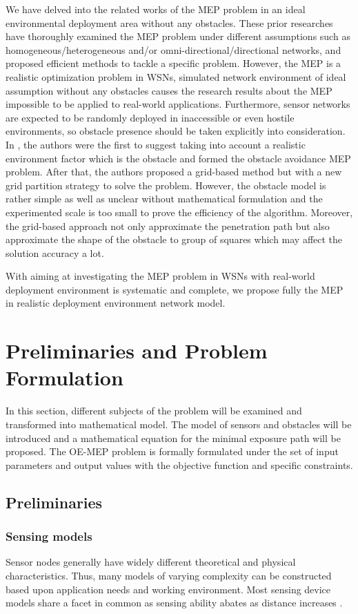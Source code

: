 \documentclass[final]{elsarticle}
\begin{document}
We have delved into the related works of the MEP problem in an ideal environmental deployment area without any obstacles. These prior researches have thoroughly examined the MEP problem under different assumptions such as homogeneous/heterogeneous and/or omni-directional/directional networks, and proposed efficient methods to tackle a specific problem. However, the MEP is a realistic optimization problem in WSNs, simulated network environment of ideal assumption without any obstacles causes the research results about the MEP impossible to be applied to real-world applications. Furthermore, sensor networks are expected to be randomly deployed in inaccessible or even hostile environments, so obstacle presence should be taken explicitly into consideration. In \cite{liu2017obstacle}, the authors were the first to suggest taking into account a realistic environment factor which is the obstacle and formed the obstacle avoidance MEP problem. After that, the authors proposed a grid-based method but with a new grid partition strategy to solve the problem. However, the obstacle model is rather simple as well as unclear without mathematical formulation and the experimented scale is too small to prove the efficiency of the algorithm. Moreover, the grid-based approach not only approximate the penetration path but also approximate the shape of the obstacle to group of squares which may affect the solution accuracy a lot.

With aiming at investigating the MEP problem in WSNs with real-world deployment environment is systematic and complete, we propose fully the MEP in realistic deployment environment network model. 
\section{Preliminaries and Problem Formulation}
In this section, different subjects of the problem will be examined and transformed into mathematical model. The model of sensors and obstacles will be introduced and a mathematical equation for the minimal exposure path will be proposed. The OE-MEP problem is formally formulated under the set of input parameters and output values with the objective function and specific constraints.
\subsection{Preliminaries}
\subsubsection{Sensing models}
Sensor nodes generally have widely different theoretical and physical characteristics. Thus, many models of varying complexity can be constructed based upon application needs and working environment. Most sensing device models share a facet in common as sensing ability abates as distance increases \cite{megerian2002exposure}.
\end{document}

